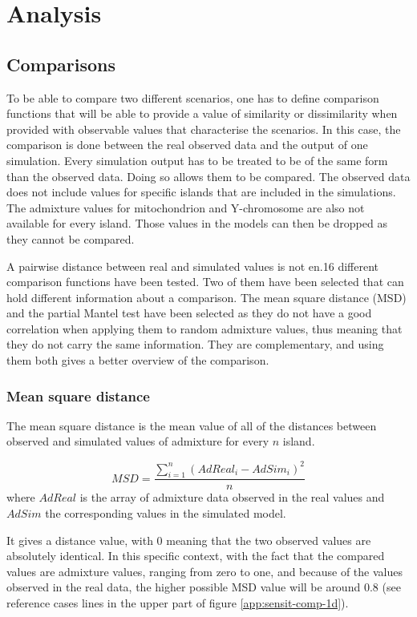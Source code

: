 \documentclass[a4paper,12pt]{report}
\begin{document}
\section{Analysis}
\label{section:analysis}
\subsection{Comparisons}
\label{subsection:comparisons}
To be able to compare two different scenarios, one has to define comparison functions that will be able to provide a value of similarity or dissimilarity when provided with observable values that characterise the scenarios. In this case, the comparison is done between the real observed data and the output of one simulation.
Every simulation output has to be treated to be of the same form than the observed data. Doing so allows them to be compared. The observed data does not include values for specific islands that are included in the simulations. The admixture values for mitochondrion and Y-chromosome are also not available for every island.
Those values in the models can then be dropped as they cannot be compared.

A pairwise distance between real and simulated values is not en.16 different comparison functions have been tested. Two of them have been selected that can hold different information about a comparison. The mean square distance (MSD) and the partial Mantel test have been selected as they do not have a good correlation when applying them to random admixture values, thus meaning that they do not carry the same information. They are complementary, and using them both gives a better overview of the comparison.

\subsubsection{Mean square distance}
The mean square distance is the mean value of all of the distances between observed and simulated values of admixture for every $n$ island.

\begin{equation}
MSD = \frac{\sum\limits_{i=1}^{n} (AdReal_i - AdSim_i) ^ 2}{n}
\end{equation}
where $AdReal$ is the array of admixture data observed in the real values and $AdSim$ the corresponding values in the simulated model.

It gives a distance value, with 0 meaning that the two observed values are absolutely identical. In this specific context, with the fact that the compared values are admixture values, ranging from zero to one, and because of the values observed in the real data, the higher possible MSD value will be around $0.8$ (see reference cases lines in the upper part of figure \ref{app:sensit-comp-1d}).
\end{document}
